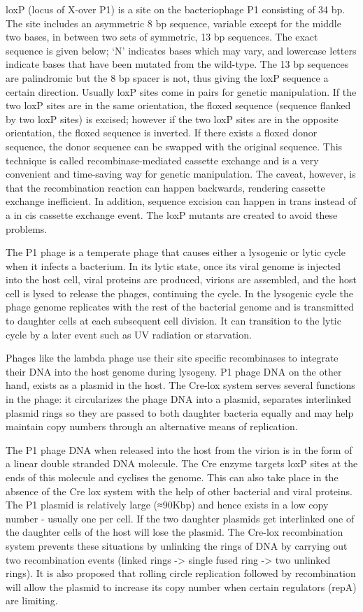 loxP (locus of X-over P1) is a site on the bacteriophage P1 consisting of 34 bp. The site includes an asymmetric 8 bp sequence, variable except for the middle two bases, in between two sets of symmetric, 13 bp sequences. The exact sequence is given below; `N' indicates bases which may vary, and lowercase letters indicate bases that have been mutated from the wild-type. The 13 bp sequences are palindromic but the 8 bp spacer is not, thus giving the loxP sequence a certain direction. Usually loxP sites come in pairs for genetic manipulation. If the two loxP sites are in the same orientation, the floxed sequence (sequence flanked by two loxP sites) is excised; however if the two loxP sites are in the opposite orientation, the floxed sequence is inverted. If there exists a floxed donor sequence, the donor sequence can be swapped with the original sequence. This technique is called recombinase-mediated cassette exchange and is a very convenient and time-saving way for genetic manipulation. The caveat, however, is that the recombination reaction can happen backwards, rendering cassette exchange inefficient. In addition, sequence excision can happen in trans instead of a in cis cassette exchange event. The loxP mutants are created to avoid these problems.

The P1 phage is a temperate phage that causes either a lysogenic or lytic cycle when it infects a bacterium. In its lytic state, once its viral genome is injected into the host cell, viral proteins are produced, virions are assembled, and the host cell is lysed to release the phages, continuing the cycle. In the lysogenic cycle the phage genome replicates with the rest of the bacterial genome and is transmitted to daughter cells at each subsequent cell division. It can transition to the lytic cycle by a later event such as UV radiation or starvation.

Phages like the lambda phage use their site specific recombinases to integrate their DNA into the host genome during lysogeny. P1 phage DNA on the other hand, exists as a plasmid in the host. The Cre-lox system serves several functions in the phage: it circularizes the phage DNA into a plasmid, separates interlinked plasmid rings so they are passed to both daughter bacteria equally and may help maintain copy numbers through an alternative means of replication.

The P1 phage DNA when released into the host from the virion is in the form of a linear double stranded DNA molecule. The Cre enzyme targets loxP sites at the ends of this molecule and cyclises the genome. This can also take place in the absence of the Cre lox system with the help of other bacterial and viral proteins. The P1 plasmid is relatively large (≈90Kbp) and hence exists in a low copy number - usually one per cell. If the two daughter plasmids get interlinked one of the daughter cells of the host will lose the plasmid. The Cre-lox recombination system prevents these situations by unlinking the rings of DNA by carrying out two recombination events (linked rings -\textgreater{} single fused ring -\textgreater{} two unlinked rings). It is also proposed that rolling circle replication followed by recombination will allow the plasmid to increase its copy number when certain regulators (repA) are limiting.

